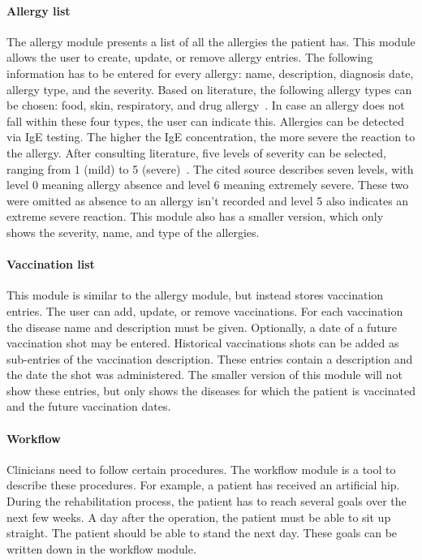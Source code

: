         \paragraph{Allergy list} The allergy module presents a list of all the allergies the patient has. This module allows the user to create, update, or remove allergy entries. The following information has to be entered for every allergy: name, description, diagnosis date, allergy type, and the severity. Based on literature, the following allergy types can be chosen: food, skin, respiratory, and drug allergy~\cite{AllergyTypesACAAI, AllergyTypesHealth24}. In case an allergy does not fall within these four types, the user can indicate this. Allergies can be detected via IgE testing. The higher the IgE concentration, the more severe the reaction to the allergy. After consulting literature, five levels of severity can be selected, ranging from 1 (mild) to 5 (severe)~\cite{AllergySeverity}. The cited source describes seven levels, with level 0 meaning allergy absence and level 6 meaning extremely severe. These two were omitted as absence to an allergy isn't recorded and level 5 also indicates an extreme severe reaction. This module also has a smaller version, which only shows the severity, name, and type of the allergies.

        \paragraph{Vaccination list} This module is similar to the allergy module, but instead stores vaccination entries. The user can add, update, or remove vaccinations. For each vaccination the disease name and description must be given. Optionally, a date of a future vaccination shot may be entered. Historical vaccinations shots can be added as sub-entries of the vaccination description. These entries contain a description and the date the shot was administered. The smaller version of this module will not show these entries, but only shows the diseases for which the patient is vaccinated and the future vaccination dates.

        \paragraph{Workflow} Clinicians need to follow certain procedures. The workflow module is a tool to describe these procedures. For example, a patient has received an artificial hip. During the rehabilitation process, the patient has to reach several goals over the next few weeks. A day after the operation, the patient must be able to sit up straight. The patient should be able to stand the next day. These goals can be written down in the workflow module.

